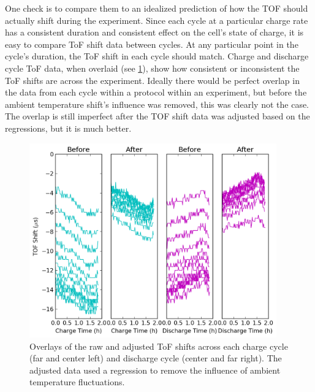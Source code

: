 One check is to compare them to an idealized prediction of how the TOF should actually shift during the experiment. 
Since each cycle at a particular charge rate has a consistent duration and consistent effect on the cell's state of charge, it is easy to compare ToF shift data between cycles. 
At any particular point in the cycle's duration, the ToF shift in each cycle should match. Charge and discharge cycle ToF data, when overlaid (see \hyperref[fig:0417overlays]{\cref{fig:0417overlays}}), show how consistent or inconsistent the ToF shifts are across the experiment.
Ideally there would be perfect overlap in the data from each cycle within a protocol within an experiment, but before the ambient temperature shift's influence was removed, this was clearly not the case. 
The overlap is still imperfect after the TOF shift data was adjusted based on the regressions, but it is much better.

\begin{figure}[t]\label{fig:0417overlays}
\includegraphics[width=0.95\textwidth]{Thesis/0417overlays.png}
\centering
\caption{Overlays of the raw and adjusted ToF shifts across each charge cycle (far and center left) and discharge cycle (center and far right). The adjusted data used a regression to remove the influence of ambient temperature fluctuations.}
\end{figure}

